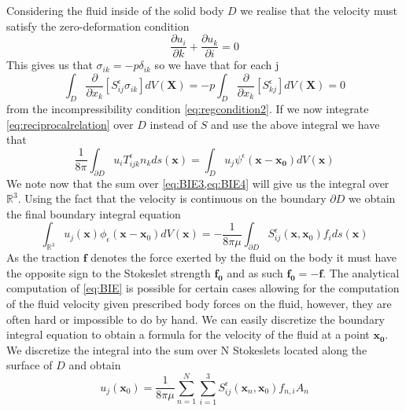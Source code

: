 Considering the fluid inside of the solid body $D$ we realise that the velocity must satisfy the zero-deformation condition
\begin{equation*}
  \frac{\partial u_i}{\partial k} + \frac{\partial u_k}{\partial i} = 0
\end{equation*}
This gives us that $\sigma_{ik} = -p\delta_{ik}$ so we have that for each j
\begin{equation*}
  \int_{D} \frac{\partial}{\partial x_k}\left[S^\epsilon_{ij}\sigma_{ik}\right]dV(\mathbf{X}) = -p\int_{D} \frac{\partial}{\partial x_k}\left[S^\epsilon_{kj}\right]dV(\mathbf{X}) = 0
\end{equation*}
from the incompressibility condition \cref{eq:regcondition2}. If we now integrate \cref{eq:reciprocalrelation} over $D$ instead of $S$ and use the above integral we have that
\begin{equation}
  \label{eq:BIE4}
\frac{1}{8\pi}\int_{\partial D} u_iT^\epsilon_{ijk}n_k ds(\mathbf{x}) = \int_D u_j \psi^\epsilon(\mathbf{x}-\mathbf{x_0}) dV(\mathbf{x})
\end{equation}
We note now that the sum over \cref{eq:BIE3,eq:BIE4} will give us the integral over $\mathbb{R}^{3}$. Using the fact that the velocity is continuous on the boundary $\partial D$ we obtain the final boundary integral equation
\begin{equation}
  \label{eq:BIE}
    \int_{\mathbb{R}^{3}} u_{j}(\mathbf{x}) \phi_{\epsilon}\left(\mathbf{x}-\mathbf{x}_{0}\right) d V(\mathbf{x})=-\frac{1}{8 \pi \mu} \int_{\partial D} S_{i j}^{\epsilon}\left(\mathbf{x}, \mathbf{x}_{0}\right) f_{i} d s(\mathbf{x})
\end{equation}
As the traction $\mathbf{f}$ denotes the force exerted by the fluid on the body it must have the opposite sign to the Stokeslet strength $\mathbf{f_0}$ and as such $\mathbf{f_0} = -\mathbf{f}$.
The analytical computation of \cref{eq:BIE} is possible for certain cases allowing for the computation of the fluid velocity given prescribed body forces on the fluid, however, they are often hard or impossible to do by hand. We can easily discretize the boundary integral equation to obtain a formula for the velocity of the fluid at a point $\mathbf{x_0}$. We discretize the integral into the sum over N Stokeslets located along the surface of $D$ and obtain
\begin{equation}
\label{eq:Stokesletsum}
    u_{j}\left(\mathbf{x}_{0}\right)=\frac{1}{8 \pi \mu} \sum_{n=1}^{N} \sum_{i=1}^{3} S_{i j}^{\epsilon}\left(\mathbf{x}_{n}, \mathbf{x}_{0}\right) f_{n, i} A_{n}
\end{equation}
